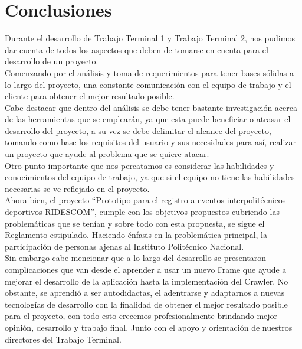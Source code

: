 \chapter*{Conclusiones}
{}
	\noindent 
	Durante el desarrollo de Trabajo Terminal 1 y Trabajo Terminal 2, nos pudimos dar cuenta
	de todos los aspectos que deben de tomarse en cuenta para el desarrollo de un proyecto. \\
	Comenzando por el análisis y toma de requerimientos para tener bases sólidas a lo largo del proyecto, una constante comunicación con el equipo de trabajo y el cliente para obtener el mejor resultado posible. \\
	Cabe destacar que dentro del análisis se debe tener bastante investigación acerca de las herramientas que se emplearán, ya que esta puede beneficiar o atrasar el desarrollo del proyecto, a su vez se debe delimitar el alcance del proyecto, tomando como base los requisitos del usuario y sus necesidades para así, realizar un proyecto que ayude al problema que se quiere atacar. \\
	Otro punto importante que nos percatamos es considerar las habilidades y conocimientos del equipo de trabajo, ya que si el equipo no tiene las habilidades necesarias se ve reflejado en el proyecto. \\
	Ahora bien, el proyecto “Prototipo para el registro a eventos interpolitécnicos deportivos RIDESCOM”, cumple con los objetivos propuestos cubriendo las problemáticas que se tenían y sobre todo con esta propuesta, se sigue el Reglamento estipulado. Haciendo énfasis en la problemática principal, la participación de personas ajenas al Instituto Politécnico Nacional. \\
	Sin embargo cabe mencionar que a lo largo del desarrollo se presentaron complicaciones que van desde el aprender a usar un nuevo Frame que ayude a mejorar el desarrollo de la aplicación hasta la implementación del Crawler. No obstante, se aprendió a ser autodidactas, el adentrarse y adaptarnos a nuevas tecnologías de desarrollo con la finalidad de obtener el mejor resultado posible para el proyecto, con todo esto crecemos profesionalmente brindando mejor opinión, desarrollo y trabajo final. Junto con el apoyo y orientación de nuestros directores del Trabajo Terminal. \\
	
	
